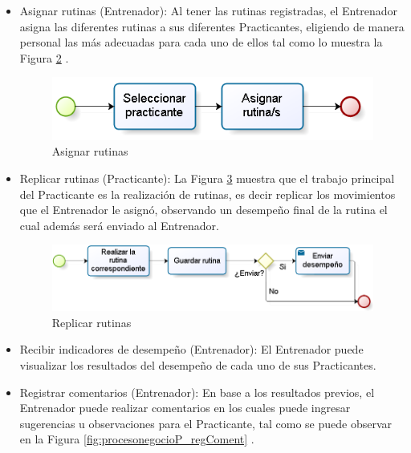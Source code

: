 \begin{enumerate}
\begin{itemize}
\begin{figure}[H]
				\label{fig:procesonegocioP_regRutinas}
			\end{figure}
		\item Asignar rutinas (Entrenador): Al tener las rutinas registradas, el Entrenador asigna las diferentes rutinas a sus diferentes Practicantes, eligiendo de manera personal las más adecuadas para cada uno de ellos tal como lo muestra la Figura \ref{fig:procesonegocioP_asigRutinas} .
			\begin{figure}[H]
				\begin{center}
					\includegraphics[scale=0.7]{./Figuras/Negocio/Asignar_rutina}
				\end{center}
				\caption{Asignar rutinas}
				\label{fig:procesonegocioP_asigRutinas}
			\end{figure}
		\item Replicar rutinas (Practicante): La Figura \ref{fig:procesonegocioP_repRutinas}  muestra que el trabajo principal del Practicante es la realización de rutinas, es decir replicar los movimientos que el Entrenador le asignó, observando un desempeño final de la rutina el cual además será enviado al Entrenador.
			\begin{figure}[H]
				\begin{center}
					\includegraphics[scale=0.7]{./Figuras/Negocio/Replicar_rutinas}
				\end{center}
				\caption{Replicar rutinas}
				\label{fig:procesonegocioP_repRutinas}
			\end{figure}
		\item Recibir indicadores de desempeño (Entrenador): El Entrenador puede visualizar los resultados del desempeño de cada uno de sus Practicantes.
		\item Registrar comentarios (Entrenador): En base a los resultados previos, el Entrenador puede realizar comentarios en los cuales puede ingresar sugerencias u observaciones para el Practicante, tal como se puede observar en la Figura \ref{fig:procesonegocioP_regComent} .

\end{itemize}
\end{enumerate}
